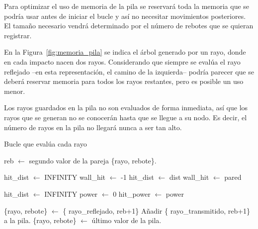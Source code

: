 Para optimizar el uso de memoria de la pila se reservará toda la memoria que se podría usar antes de iniciar el bucle y así no necesitar movimientos posteriores.
El tamaño necesario vendrá determinado por el número de rebotes que se quieran registrar.

\begin{figure}[H]
    \centering
    
\end{figure}

En la Figura~\ref{fig:memoria_pila} se indica el árbol generado por un rayo, donde en cada impacto nacen dos rayos.
Considerando que siempre se evalúa el rayo reflejado --en esta representación, el camino de la izquierda-- podría parecer que se deberá reservar memoria para todos los rayos restantes, pero es posible un uso menor.

Los rayos guardados en la pila no son evaluados de forma inmediata, así que los rayos que se generan no se conocerán hasta que se llegue a su nodo.
Es decir, el número de rayos en la pila no llegará nunca a ser tan alto.


\begin{algorithm}
    \caption{Bucle que evalúa cada rayo}
    \label{euclid}
    \begin{algorithmic}[1]
        
            \State reb $\gets$ segundo valor de la pareja \{rayo, rebote\}.

                \State hit\_dist $\gets$ INFINITY
                \State wall\_hit $\gets$ -1
                        \State hit\_dist $\gets$ dist
                        \State wall\_hit $\gets$ pared
                    \EndIf
                \EndIf
            \EndFor

                \State hit\_dist $\gets$ INFINITY
                \State power $\gets$ 0
                        \State hit\_power $\gets$ power
                    \EndIf
                \EndIf
            \EndFor

                \State \{rayo, rebote\} $\gets$ \{ rayo\_reflejado, reb+1\}
                \State Añadir \{ rayo\_transmitido, reb+1\} a la pila.
            \Else
                \State \{rayo, rebote\} $\gets$ último valor de la pila.
            \EndIf
        \EndWhile
    \end{algorithmic}
\end{algorithm}

